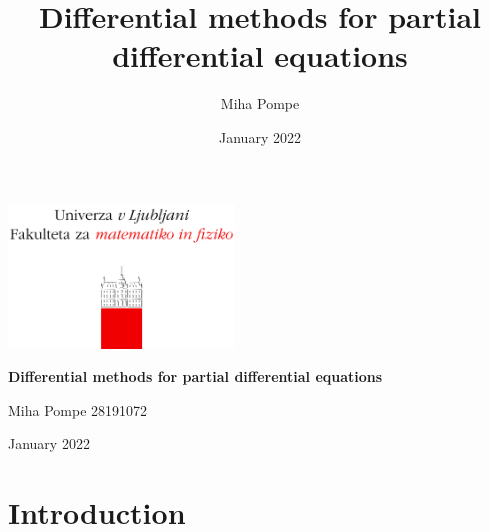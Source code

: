\documentclass[12pt, a4paper]{article}
\title{Differential methods for partial differential equations}
\author{Miha Pompe}
\date{January 2022}
\begin{document}
\begin{titlepage}
	\centering
 	\includegraphics[width=0.45\textwidth]{logo_fmf_uni-lj_sl_veliki.png}\par\vspace{1cm}
	\vspace{1cm}
	\vspace{1.5cm}
	{\huge\bfseries Differential methods for partial differential equations\par}
	\vspace{2cm}
	{\Large Miha Pompe 28191072\par}
	\vfill
	\vfill
	{\large January 2022\par}
\end{titlepage}
\thispagestyle{empty}
\clearpage
{}
\newpage


\section{Introduction}
\end{document}
